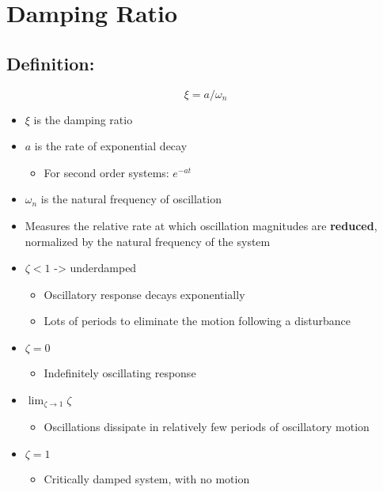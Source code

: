 \documentclass[10pt]{report}
\begin{document}
\chapter{Damping Ratio}


\section{Definition: }

$$\xi = a/\omega_{n}$$

\begin{itemize}
\item $\xi$ is the damping ratio
\item $a$ is the rate of exponential decay

\begin{itemize}
\item For second order systems: $e^{-at}$ 

\end{itemize}
\item $\omega_{n}$ is the natural frequency of oscillation 

\item Measures the relative rate at which oscillation magnitudes are \textbf{reduced}, normalized by the natural frequency of the system

\item $\zeta < 1$ ->  underdamped

\begin{itemize}
\item Oscillatory response decays exponentially 

\item Lots of periods to eliminate the motion following a disturbance

\end{itemize}
\item $\zeta=0$ 

\begin{itemize}
\item Indefinitely oscillating response

\end{itemize}
\item $\lim_{\zeta \rightarrow 1} \zeta$

\begin{itemize}
\item Oscillations dissipate in relatively few periods of oscillatory motion

\end{itemize}
\item $\zeta=1$ 

\begin{itemize}
\item Critically damped system, with no motion

\end{itemize}
\end{itemize}
\end{document}
